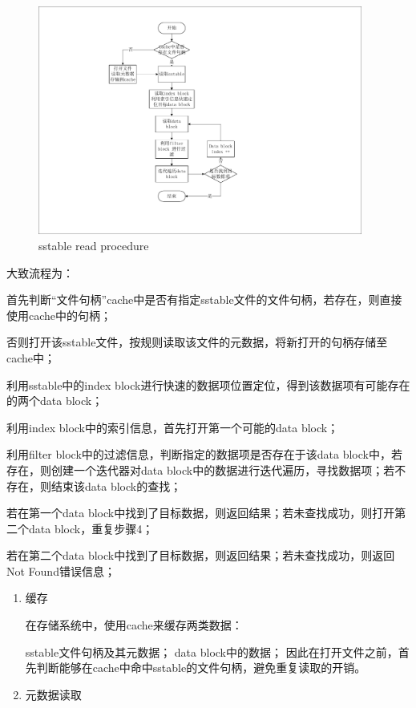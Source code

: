 \begin{enumerate}
\begin{enumerate}
\begin{figure}[H]
	\centering
	\includegraphics[width=0.95\textwidth]{pdf/sstable_read_procedure.pdf}
	\caption{sstable read procedure}
	\label{sstable_read_procedure}
\end{figure}

大致流程为：

首先判断“文件句柄”cache中是否有指定sstable文件的文件句柄，若存在，则直接使用cache中的句柄；

否则打开该sstable文件，按规则读取该文件的元数据，将新打开的句柄存储至cache中；

利用sstable中的index block进行快速的数据项位置定位，得到该数据项有可能存在的两个data block；

利用index block中的索引信息，首先打开第一个可能的data block；

利用filter block中的过滤信息，判断指定的数据项是否存在于该data block中，若存在，则创建一个迭代器对data block中的数据进行迭代遍历，寻找数据项；若不存在，则结束该data block的查找；

若在第一个data block中找到了目标数据，则返回结果；若未查找成功，则打开第二个data block，重复步骤4；

若在第二个data block中找到了目标数据，则返回结果；若未查找成功，则返回Not Found错误信息；

		\begin{enumerate}
			\item 缓存 
			

			在存储系统中，使用cache来缓存两类数据：

sstable文件句柄及其元数据；
data block中的数据；
因此在打开文件之前，首先判断能够在cache中命中sstable的文件句柄，避免重复读取的开销。

			\item 元数据读取 
			


\end{enumerate}
\end{enumerate}
\end{enumerate}
